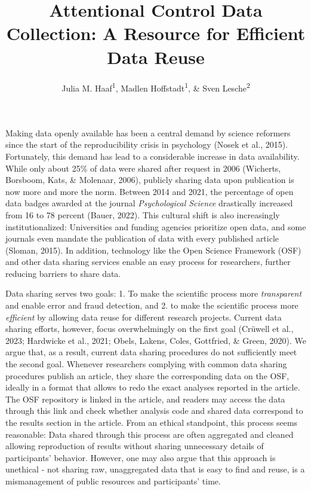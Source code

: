 \documentclass[
  man,floatsintext]{apa6}
\title{Attentional Control Data Collection: A Resource for Efficient Data Reuse}
\author{Julia M. Haaf\textsuperscript{1}, Madlen Hoffstadt\textsuperscript{1}, \& Sven Lesche\textsuperscript{2}}
\date{}
\affiliation{\vspace{0.5cm}\textsuperscript{1} University of Amsterdam\\\textsuperscript{2} University of Heidelberg}
\begin{document}
\maketitle

Making data openly available has been a central demand by science reformers since the start of the reproducibility crisis in psychology (Nosek et al., 2015). Fortunately, this demand has lead to a considerable increase in data availability. While only about 25\% of data were shared after request in 2006 (Wicherts, Borsboom, Kats, \& Molenaar, 2006), publicly sharing data upon publication is now more and more the norm. Between 2014 and 2021, the percentage of open data badges awarded at the journal \emph{Psychological Science} drastically increased from 16 to 78 percent (Bauer, 2022). This cultural shift is also increasingly institutionalized: Universities and funding agencies prioritize open data, and some journals even mandate the publication of data with every published article (Sloman, 2015). In addition, technology like the Open Science Framework (OSF) and other data sharing services enable an easy process for researchers, further reducing barriers to share data.

Data sharing serves two goals: 1. To make the scientific process more \emph{transparent} and enable error and fraud detection, and 2. to make the scientific process more \emph{efficient} by allowing data reuse for different research projects. Current data sharing efforts, however, focus overwhelmingly on the first goal (Crüwell et al., 2023; Hardwicke et al., 2021; Obels, Lakens, Coles, Gottfried, \& Green, 2020). We argue that, as a result, current data sharing procedures do not sufficiently meet the second goal. Whenever researchers complying with common data sharing procedures publish an article, they share the corresponding data on the OSF, ideally in a format that allows to redo the exact analyses reported in the article. The OSF repository is linked in the article, and readers may access the data through this link and check whether analysis code and shared data correspond to the results section in the article. From an ethical standpoint, this process seems reasonable: Data shared through this process are often aggregated and cleaned allowing reproduction of results without sharing unnecessary details of participants' behavior. However, one may also argue that this approach is unethical - not sharing raw, unaggregated data that is easy to find and reuse, is a mismanagement of public resources and participants' time.
\end{document}
